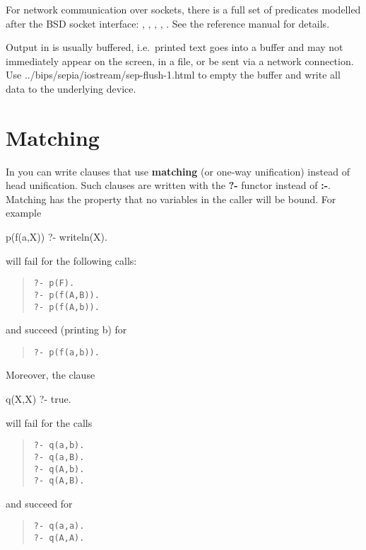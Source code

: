 For network communication over sockets, there is a full set of predicates
modelled after the BSD socket interface:
,
,
,
,
.
See the reference manual for details.

Output in \eclipse{} is usually buffered, i.e.\ printed text goes into
a buffer and may not immediately appear on the screen, in a file, or
be sent via a network connection. Use
{../bips/sepia/iostream/sep-flush-1.html}
to empty the buffer and write all data to the underlying device.




\section{Matching}
In \eclipse{} you can write clauses that use {\bf matching} (or one-way
unification) instead of head unification. 
Such clauses are written with the {\bf ?-} functor instead of {\bf :-}.
Matching has the property that no variables in the caller will be bound.
For example
\begin{code}
p(f(a,X)) ?- writeln(X).
\end{code}
will fail for the following calls:
\begin{quote}\begin{verbatim}
?- p(F).
?- p(f(A,B)).
?- p(f(A,b)).
\end{verbatim}\end{quote}
and succeed (printing b) for
\begin{quote}\begin{verbatim}
?- p(f(a,b)).
\end{verbatim}\end{quote}
Moreover, the clause
\begin{code}
q(X,X) ?- true.
\end{code}
will fail for the calls
\begin{quote}\begin{verbatim}
?- q(a,b).
?- q(a,B).
?- q(A,b).
?- q(A,B).
\end{verbatim}\end{quote}
and succeed for
\begin{quote}\begin{verbatim}
?- q(a,a).
?- q(A,A).
\end{verbatim}\end{quote}



